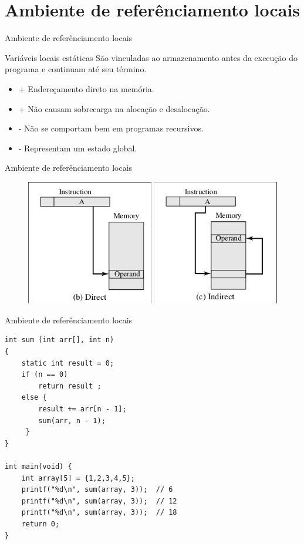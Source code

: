 \section{Ambiente de referênciamento locais}
\begin{frame}{Ambiente de referênciamento locais}
\begin{block}{Variáveis locais estáticas}
	São vinculadas ao armazenamento antes da execução do programa e continuam até seu término.
	\begin{itemize}
	  \item + Endereçamento direto na memória.
	  \item + Não causam sobrecarga na alocação e desalocação.
	  \item - Não se comportam bem em programas recursivos.
	  \item - Representam um estado global.
	\end{itemize}
\end{block}
\end{frame}

\begin{frame}{Ambiente de referênciamento locais}
\begin{figure}[ht!]
 \centering
 \includegraphics[scale=0.5]{./imgs/enderecamento.png}
\label{enderecamento}
\end{figure}
\end{frame}

\begin{frame}[fragile]{Ambiente de referênciamento locais}
\begin{lstlisting}
int sum (int arr[], int n)
{
    static int result = 0;
    if (n == 0)
        return result ;
    else {
        result += arr[n - 1];
        sum(arr, n - 1);
     }
}

int main(void) {
    int array[5] = {1,2,3,4,5};
    printf("%d\n", sum(array, 3));  // 6
    printf("%d\n", sum(array, 3));  // 12
    printf("%d\n", sum(array, 3));  // 18
    return 0;
}
\end{lstlisting}
\end{frame}

